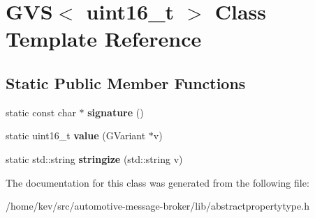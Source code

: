 \hypertarget{classGVS_3_01uint16__t_01_4}{\section{G\+V\+S$<$ uint16\+\_\+t $>$ Class Template Reference}
\label{classGVS_3_01uint16__t_01_4}
}
\subsection*{Static Public Member Functions}
\begin{DoxyCompactItemize}
\item 
\hypertarget{classGVS_3_01uint16__t_01_4_a7db0c4a8cd2454cd49ede1fb7a026e49}{static const char $\ast$ {\bfseries signature} ()}\label{classGVS_3_01uint16__t_01_4_a7db0c4a8cd2454cd49ede1fb7a026e49}

\item 
\hypertarget{classGVS_3_01uint16__t_01_4_a629f9b3cba434e8c808d545ca8a8e557}{static uint16\+\_\+t {\bfseries value} (G\+Variant $\ast$v)}\label{classGVS_3_01uint16__t_01_4_a629f9b3cba434e8c808d545ca8a8e557}

\item 
\hypertarget{classGVS_3_01uint16__t_01_4_a4d7e2288bb0be81487945a42e7aa8224}{static std\+::string {\bfseries stringize} (std\+::string v)}\label{classGVS_3_01uint16__t_01_4_a4d7e2288bb0be81487945a42e7aa8224}

\end{DoxyCompactItemize}


The documentation for this class was generated from the following file\+:\begin{DoxyCompactItemize}
\item 
/home/kev/src/automotive-\/message-\/broker/lib/abstractpropertytype.\+h\end{DoxyCompactItemize}
